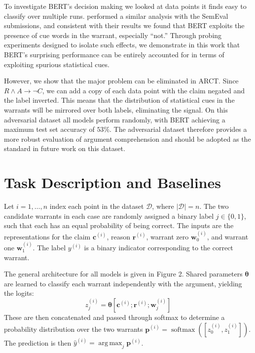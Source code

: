 \documentclass[11pt,a4paper]{article}
\DeclareMathOperator*{\argmax}{arg\,max}
\DeclareMathOperator{\softmax}{softmax}
\begin{document}
To investigate BERT's decision making we looked at data points it finds easy to classify over multiple runs. \citeauthor{HabernalWGS18}  performed a similar analysis with the SemEval submissions, and consistent with their results we found that BERT exploits the presence of cue words in the warrant, especially ``not.'' Through probing experiments designed to isolate such effects, we demonstrate in this work that BERT's surprising performance can be entirely accounted for in terms of exploiting spurious statistical cues.

However, we show that the major problem can be eliminated in ARCT. Since $R \land A \rightarrow \lnot C$, we can add a copy of each data point with the claim negated and the  label inverted. This means that the distribution of statistical cues in the warrants will be mirrored over both labels, eliminating the signal. On this adversarial dataset all models perform randomly, with BERT achieving a maximum test set accuracy of $53\%$. The adversarial dataset therefore provides a more robust evaluation of argument comprehension and should be adopted as the standard in future work on this dataset.

\section{Task Description and Baselines}

Let $i = 1,\dots,n$ index each point in the dataset $\mathcal{D}$, where $|\mathcal{D}| = n$. The two candidate warrants in each case are randomly assigned a binary label $j \in \{0, 1\}$, such that each has an equal probability of being correct. The inputs are the representations for the claim $\mathbf{c}^{(i)}$, reason $\mathbf{r}^{(i)}$, warrant zero $\mathbf{w}^{(i)}_0$, and warrant one $\mathbf{w}^{(i)}_1$. The label $y^{(i)}$ is a binary indicator corresponding to the correct warrant.

The general architecture for all models is given in Figure 2. Shared parameters $\boldsymbol{\theta}$ are learned to classify each warrant independently with the argument, yielding the logits:
\begin{equation*}
    z^{(i)}_j = \boldsymbol{\theta} [\boldsymbol{c}^{(i)}; \boldsymbol{r}^{(i)}; \boldsymbol{w}^{(i)}_j]
\end{equation*}
\noindent
These are then concatenated and passed through softmax to determine a probability distribution over the two warrants $\mathbf{p}^{(i)} = \softmax([z^{(i)}_0, z^{(i)}_1])$. The prediction is then $\hat{y}^{(i)} = \argmax_j \mathbf{p}^{(i)}$.
\end{document}
